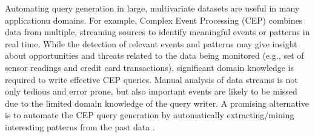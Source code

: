 \documentclass[conference]{IEEEtran}  %
\begin{document}
Automating query generation in large, multivariate datasets are useful in many applicationu domains. For example, Complex Event Processing (CEP) \cite{IEEEexample:autoCEP} combines data from multiple, streaming sources to identify meaningful events or patterns in real time. While the detection of relevant events and patterns may give insight about opportunities and threats related to the data being monitored (e.g., set of sensor readings and credit card transactions), significant domain knowledge is required to write effective CEP queries. Manual analysis of data streams is not only tedious and error prone, but also important events are likely to be missed due to the limited domain knowledge of the query writer. A promising alternative is to automate the CEP query generation by automatically extracting/mining interesting patterns from the past data \cite{IEEEexample:autoCEP,IEEEexample:TowardsAutomated,IEEEexample:LearningFromThePast}.
\end{document}
